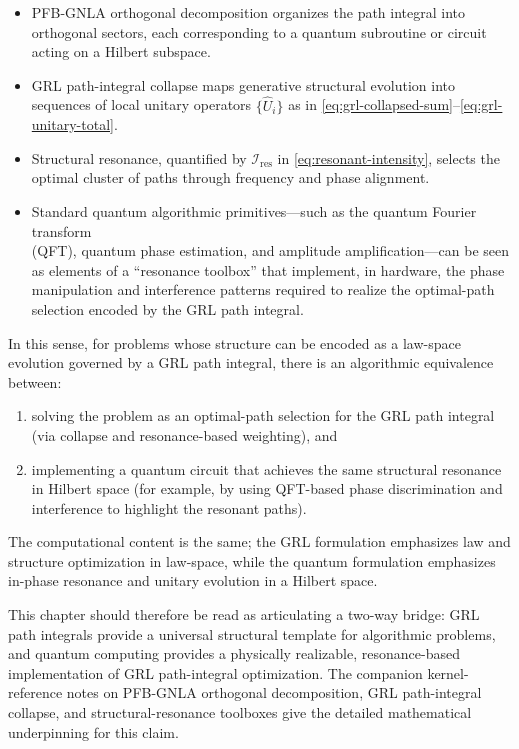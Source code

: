 \documentclass[11pt]{book}
\theoremstyle{plain}
\theoremstyle{definition}
\theoremstyle{remark}
\begin{document}
\begin{itemize}
  \item PFB-GNLA orthogonal decomposition organizes the path integral into
        orthogonal sectors, each corresponding to a quantum subroutine or
        circuit acting on a Hilbert subspace.
  \item GRL path-integral collapse maps generative structural evolution
        into sequences of local unitary operators
        $\{\hat{U}_i\}$ as in
        \eqref{eq:grl-collapsed-sum}--\eqref{eq:grl-unitary-total}.
  \item Structural resonance, quantified by
        $\mathcal{I}_{\mathrm{res}}$ in
        \eqref{eq:resonant-intensity}, selects the optimal cluster of
        paths through frequency and phase alignment.
  \item Standard quantum algorithmic primitives---such as the quantum
        Fourier transform \\(QFT), quantum phase estimation, and amplitude
        amplification---can be seen as elements of a ``resonance
        toolbox'' that implement, in hardware, the phase manipulation and
        interference patterns required to realize the optimal-path
        selection encoded by the GRL path integral.
\end{itemize}

In this sense, for problems whose structure can be encoded as a
law-space evolution governed by a GRL path integral, there is an
algorithmic equivalence between:
\begin{enumerate}
  \item solving the problem as an optimal-path selection for the GRL
        path integral (via collapse and resonance-based weighting), and
  \item implementing a quantum circuit that achieves the same structural
        resonance in Hilbert space (for example, by using QFT-based phase
        discrimination and interference to highlight the resonant paths).
\end{enumerate}
The computational content is the same; the GRL formulation emphasizes law
and structure optimization in law-space, while the quantum formulation
emphasizes in-phase resonance and unitary evolution in a Hilbert space.

This chapter should therefore be read as articulating a two-way bridge:
GRL path integrals provide a universal structural template for
algorithmic problems, and quantum computing provides a physically
realizable, resonance-based implementation of GRL path-integral
optimization. The companion kernel-reference notes on PFB-GNLA orthogonal
decomposition, GRL path-integral collapse, and structural-resonance
toolboxes give the detailed mathematical underpinning for this claim.
\end{document}
